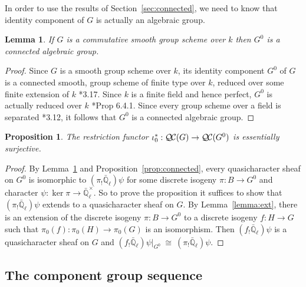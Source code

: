 \documentclass{amsart}
\theoremstyle{plain}
\newtheorem{proposition}[theorem]{Proposition}
\newtheorem{lemma}[theorem]{Lemma}
\theoremstyle{definition}
\theoremstyle{remark}
\newcommand{\EE}{\mathbb{\bar Q}_\ell}
\newcommand{\Fq}{k}
\newcommand{\EEx}{\EE^\times}
\newcommand{\iso}{{\ \cong\ }}
\newcommand{\qcs}[1]{{\mathcal{#1}}}
\newcommand{\QC}{{\mathcal{Q\hskip-0.8pt C}}}
\begin{document}
In order to use the results of Section~\ref{sec:connected}, we need to know that
identity component of $G$ is actually an algebraic group.

\begin{lemma} \label{lem:G0alg-grp}
If $G$ is a commutative smooth group scheme over $\Fq$ then $G^0$ is a connected algebraic group.
\end{lemma}
\begin{proof}
 Since $G$ is a smooth group scheme over $\Fq$, its
 identity component $G^0$ of $G$ is a connected smooth,
 group scheme of finite type over $\Fq$, reduced over some finite extension of $\Fq$
 \cite{vdGeer-Moonen:AbelianVarieties}*{3.17}.
 Since $\Fq$ is a finite field and hence perfect, $G^0$ is actually reduced over $\Fq$
 \cite{EGAIV2}*{Prop 6.4.1}.  Since every group scheme over a field is separated
 \cite{vdGeer-Moonen:AbelianVarieties}*{3.12},
 it follows that $G^0$ is a connected algebraic group.
\end{proof}

\begin{proposition}\label{prop:restriction}
The restriction functor $\iota_0^* : \QC(G)\to \QC(G^0)$ is essentially surjective.
\end{proposition}

\begin{proof}
  By Lemma~\ref{lem:G0alg-grp} and Proposition~\ref{prop:connected}, every
  quasicharacter sheaf on $G^0$ is isomorphic to $(\pi_! \EE)\psi$ for some discrete isogeny $\pi : B \to G^0$ and character $\psi : \ker \pi \to \EEx$.
  So to prove the proposition it suffices to show that $(\pi_! \EE)\psi$ extends to a quasicharacter sheaf on $G$.
%
 By Lemma~\ref{lemma:ext}, there is an extension of the
 discrete isogeny $\pi : B \to G^0$ to a discrete isogeny $f : H \to G$
 such that $\pi_0(f) : \pi_0(H)\to \pi_0(G)$ is an isomorphism.
 Then $(f_! \EE)\psi$ is a quasicharacter sheaf on $G$ and
 $(f_! \EE)\psi\vert_{G^0} \iso (\pi_! \EE)\psi$.
\end{proof}

\subsection{The component group sequence} \label{sec:component}
\end{document}
